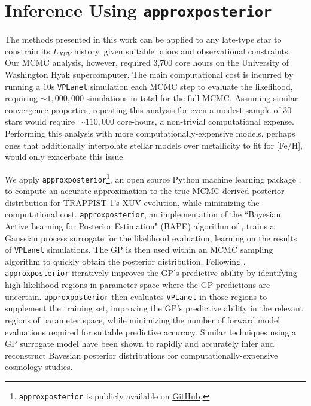 \documentclass[twocolumn]{aastex62}
\newcommand{\vplanet}[0]{\texttt{VPLanet}\xspace}
\newcommand{\approxposterior}[0]{\texttt{approxposterior}\xspace}
\begin{document}

\section{Inference Using \approxposterior} \label{sec:approx}

The methods presented in this work can be applied to any late-type star to constrain its $L_{XUV}$ history, given suitable priors and observational constraints. Our MCMC analysis, however, required 3,700 core hours on the University of Washington Hyak supercomputer. The main computational cost is incurred by running a $10$s \vplanet simulation each MCMC step to evaluate the likelihood, requiring ${\sim}1,000,000$ simulations in total for the full MCMC. Assuming similar convergence properties, repeating this analysis for even a modest sample of 30 stars would require~${\sim} 110,000$ core-hours, a non-trivial computational expense. Performing this analysis with more computationally-expensive models, perhaps ones that additionally interpolate stellar models over metallicity to fit for [Fe/H], would only exacerbate this issue.


We apply \approxposterior\footnote{\approxposterior is publicly available on \href{https://github.com/dflemin3/approxposterior}{GitHub}.}, an open source Python machine learning package \citep{FlemingVanderPlas2018}, to compute an accurate approximation to the true MCMC-derived posterior distribution for TRAPPIST-1's XUV evolution, while minimizing the computational cost. \approxposterior, an implementation of the ``Bayesian Active Learning for Posterior Estimation" (BAPE) algorithm of \citet{Kandasamy2015}, trains a Gaussian process \citep[GP, ][]{Rasmussen2006} surrogate for the likelihood evaluation, learning on the results of \vplanet simulations. The GP is then used within an MCMC sampling algorithm to quickly obtain the posterior distribution. Following \citet{Kandasamy2015}, \approxposterior iteratively improves the GP's predictive ability by identifying high-likelihood regions in parameter space where the GP predictions are uncertain. \approxposterior then evaluates \vplanet in those regions to supplement the training set, improving the GP's predictive ability in the relevant regions of parameter space, while minimizing the number of forward model evaluations required for suitable predictive accuracy. Similar techniques using a GP surrogate model have been shown to rapidly and accurately infer \citep[e.g.][]{Bird2019,Rogers2019,Takhtaganov2019} and reconstruct \citep{McClintock2019} Bayesian posterior distributions for computationally-expensive cosmology studies.
\end{document}
